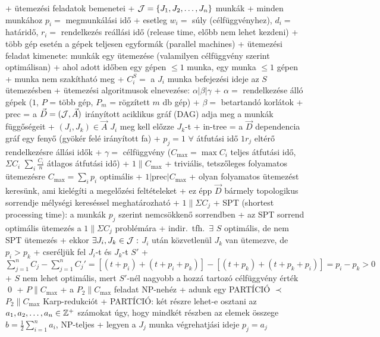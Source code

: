 + ütemezési feladatok bemenetei
  + $\mathcal{J} = \{J_1, J_2, \ldots, J_n\}$ munkák
  + minden munkához $p_i =$ megmunkálási idő
  + esetleg $w_i =$ súly (célfüggvényhez), $d_i =$ határidő, $r_i =$
    rendelkezés reállási idő (release time, előbb nem lehet kezdeni)
  + több gép esetén a gépek teljesen egyformák (parallel machines)
+ ütemezési feladat kimenete: munkák egy ütemezése (valamilyen
  célfüggvény szerint optimálisan)
  + ahol adott időben egy gépen $\le 1$ munka, egy munka $\le 1$ gépen
  + munka nem szakítható meg
  + $C_i^S =$ a $J_i$ munka befejezési ideje az $S$ ütemezésben
+ ütemezési algoritmusok elnevezése: $\alpha | \beta | \gamma$
  + $\alpha =$ rendelkezése álló gépek ($1$, $P$ = több gép, $P_m$ =
    rögzített $m$ db gép)
  + $\beta =$ betartandó korlátok
    + prec = a $\vec{D} = (\mathcal{J}, \vec{A})$ irányított aciklikus gráf
      (DAG) adja meg a munkák függőségeit
      + $(J_i, J_k) \in \vec{A}$ \RA $J_i$ meg kell előzze $J_k$-t
      + in-tree = a $\vec{D}$ dependencia gráf egy fenyő (gyökér felé
        irányított fa)
    + $p_j = 1$ \RA $\forall$ átfutási idő $1$\qquad$r_j$ \RA eltérő
      rendelkezésre állási idők
  + $\gamma =$ célfüggvény ($C_{\max} = \max C_i$ teljes átfutási idő,
    $\Sigma C_i$ \ra $\sum_{i} \frac{C_i}{n}$ átlagos átfutási idő)
+ \prob $1\|C_{\max}$
  + triviális, tetszőleges folyamatos ütemezésre $C_{\max} = \sum_{i}
    p_i$ optimális
+ \prob $1|\textrm{prec}|C_{\max}$
  + olyan folyamatos ütemezést keresünk, ami kielégíti a megelőzési
    feltételeket
  + ez épp $\vec{D}$ bármely topologikus sorrendje \RA mélységi
    kereséssel meghatározható
+ \prob $1\|\Sigma C_j$
  + SPT (shortest processing time): a munkák $p_j$ szerint nemcsökkenő
    sorrendben
  + \thm az SPT sorrend optimális ütemezés a $1\|\Sigma C_j$
    problémára
    + \proof indir.~tfh.~$\exists$ $S$ optimális, de nem SPT ütemezés
    + ekkor $\exists J_i, J_k \in \mathcal{J} :$ $J_i$ után közvetlenül $J_k$
      van ütemezve, de $p_i > p_k$
    + cseréljük fel $J_i$-t és $J_k$-t \RA $S'$
      + $\sum_{j = 1}^n C_j - \sum_{j = 1}^n C_j' = [(t + p_i) + (t +
        p_i + p_k)] - [(t + p_k) + (t + p_k + p_i)] = p_i - p_k > 0$
      + $S$ nem lehet optimális, mert $S'$-nél nagyobb a hozzá tartozó
        célfüggvény érték \qed
+ \prob $P\|C_{\max}$
  + \thm a $P_2\|C_{\max}$ feladat NP-nehéz
    + \proof adunk egy PARTÍCIÓ $\prec$ $P_2\|C_{\max}$ Karp-redukciót
    + PARTÍCIÓ: két részre lehet-e osztani az $a_1, a_2, \ldots, a_n
      \in \mathbb{Z}^+$ számokat úgy, hogy mindkét részben az elemek összege $b
      = \frac{1}{2} \sum_{i = 1}^n a_i$, NP-teljes
    + legyen a $J_j$ munka végrehatjási ideje $p_j = a_j$ \RA%
